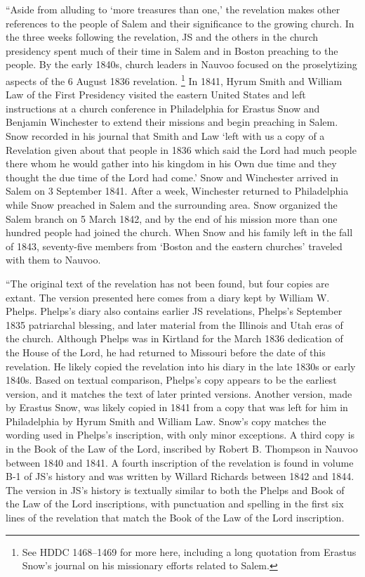 			``Aside from alluding to `more treasures than one,' the revelation makes other references to the people of Salem and their significance to the growing church. In the three weeks following the revelation, JS and the others in the church presidency spent much of their time in Salem and in Boston preaching to the people. By the early 1840s, church leaders in Nauvoo focused on the proselytizing aspects of the 6 August 1836 revelation.%
				\footnote{%
					See HDDC 1468--1469 for more here, including a long quotation from Erastus Snow's journal on his missionary efforts related to Salem.
					}
			In 1841, Hyrum Smith and William Law of the First Presidency visited the eastern United States and left instructions at a church conference in Philadelphia for Erastus Snow and Benjamin Winchester to extend their missions and begin preaching in Salem. Snow recorded in his journal that Smith and Law `left with us a copy of a Revelation given about that people in 1836 which said the Lord had much people there whom he would gather into his kingdom in his Own due time and they thought the due time of the Lord had come.' Snow and Winchester arrived in Salem on 3 September 1841. After a week, Winchester returned to Philadelphia while Snow preached in Salem and the surrounding area. Snow organized the Salem branch on 5 March 1842, and by the end of his mission more than one hundred people had joined the church. When Snow and his family left in the fall of 1843, seventy-five members from `Boston and the eastern churches' traveled with them to Nauvoo.

			``The original text of the revelation has not been found, but four copies are extant. The version presented here comes from a diary kept by William W. Phelps. Phelps's diary also contains earlier JS revelations, Phelps's September 1835 patriarchal blessing, and later material from the Illinois and Utah eras of the church. Although Phelps was in Kirtland for the March 1836 dedication of the House of the Lord, he had returned to Missouri before the date of this revelation. He likely copied the revelation into his diary in the late 1830s or early 1840s. Based on textual comparison, Phelps's copy appears to be the earliest version, and it matches the text of later printed versions. Another version, made by Erastus Snow, was likely copied in 1841 from a copy that was left for him in Philadelphia by Hyrum Smith and William Law. Snow's copy matches the wording used in Phelps's inscription, with only minor exceptions. A third copy is in the Book of the Law of the Lord, inscribed by Robert B. Thompson in Nauvoo between 1840 and 1841. A fourth inscription of the revelation is found in volume B-1 of JS's history and was written by Willard Richards between 1842 and 1844. The version in JS's history is textually similar to both the Phelps and Book of the Law of the Lord inscriptions, with punctuation and spelling in the first six lines of the revelation that match the Book of the Law of the Lord inscription.

